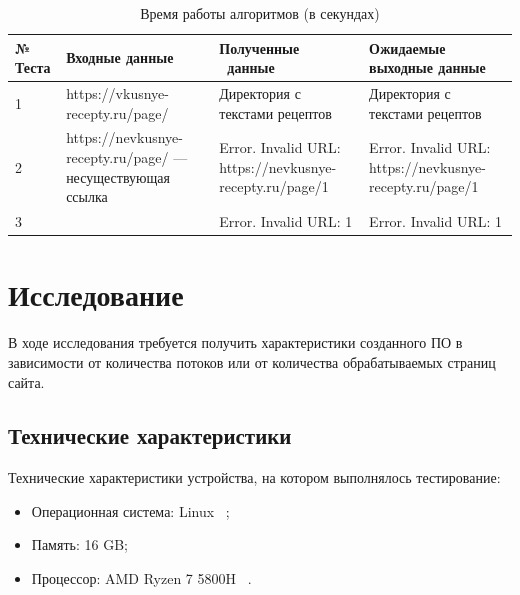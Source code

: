 \begin{table}[h]
	\begin{center}
		\begin{threeparttable}
		\captionsetup{justification=raggedright,singlelinecheck=off}
		\caption{Время работы алгоритмов (в секундах)}
		\label{tbl:time_measurements}
                        \begin{tabular}{|p{4cm}|p{4cm}|p{4cm}|p{4cm}|}
                            \hline
                            № Теста & Входные данные & Полученные \ данные & Ожидаемые выходные данные \\
                            \hline
                            1 & https://vkusnye-recepty.ru/page/ & Директория с текстами рецептов &
                            Директория с текстами рецептов \\
                            \hline
                            2 & https://nevkusnye-recepty.ru/page/ --- несуществующая ссылка
                              & Error. Invalid URL: https://nevkusnye-recepty.ru/page/1 &
                            Error. Invalid URL: https://nevkusnye-recepty.ru/page/1 \\
                            \hline
                            3 &  & Error. Invalid URL: 1 &
                            Error. Invalid URL: 1 \\
                            \hline

                        \end{tabular}
		\end{threeparttable}
    \end{center}
\end{table}

\section{Исследование}
В ходе исследования требуется получить характеристики созданного ПО в зависимости
от количества потоков или от количества обрабатываемых страниц сайта.

\subsection{Технические характеристики}
Технические характеристики устройства, на котором выполнялось тестирование:
\begin{itemize}
    \item Операционная система: Linux ~\cite{bib1};
    \item Память: 16 GB;
    \item Процессор: AMD Ryzen 7 5800H ~\cite{bib2, bib3}.
\end{itemize}

